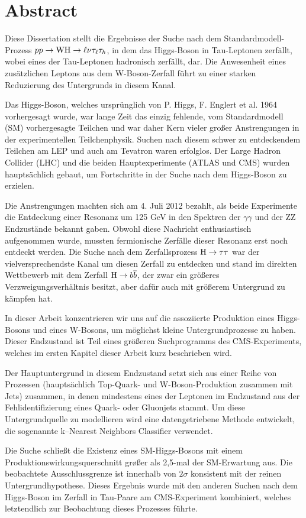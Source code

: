 \chapter*{Abstract}

Diese Dissertation stellt die Ergebnisse der Suche nach dem Standardmodell-Prozess $pp \rightarrow \mathrm{W}\mathrm{H} \rightarrow \ell \nu \tau_\ell \tau_h$, in dem das Higgs-Boson in Tau-Leptonen zerf\"allt, wobei eines der Tau-Leptonen hadronisch zerf\"allt, dar. Die Anwesenheit eines zus\"atzlichen Leptons aus dem W-Boson-Zerfall f\"uhrt zu einer starken Reduzierung des Untergrunds in diesem Kanal.

Das Higgs-Boson, welches urspr\"unglich von P. Higgs, F. Englert et al. 1964 vorhergesagt wurde, war lange Zeit das einzig fehlende, vom Standardmodell (SM) vorhergesagte Teilchen und war daher Kern vieler gro\ss{}er Anstrengungen in der experimentellen Teilchenphysik. Suchen nach diesem schwer zu entdeckendem Teilchen am LEP und auch am Tevatron waren erfolglos. Der Large Hadron Collider (LHC) und die beiden Hauptexperimente (ATLAS und CMS) wurden haupts\"achlich gebaut, um Fortschritte in der Suche nach dem Higgs-Boson zu erzielen.

Die Anstrengungen machten sich am 4. Juli 2012 bezahlt, als beide Experimente die Entdeckung einer Resonanz um 125 GeV in den Spektren der $\gamma \gamma$ und der ZZ Endzust\"ande bekannt gaben. Obwohl diese Nachricht enthusiastisch aufgenommen wurde, mussten fermionische Zerf\"alle dieser Resonanz erst noch entdeckt werden. Die Suche nach dem Zerfallsprozess $\mathrm{H} \rightarrow \tau \tau$ war der vielversprechendste Kanal um diesen Zerfall zu entdecken und stand im direkten Wettbewerb mit dem Zerfall $\mathrm{H} \rightarrow b\overline{b}$, der zwar ein gr\"o\ss{}eres Verzweigungsverh\"altnis besitzt, aber daf\"ur auch mit gr\"o\ss{}erem Untergrund zu k\"ampfen hat.

In dieser Arbeit konzentrieren wir uns auf die assoziierte Produktion eines Higgs-Bosons und eines W-Bosons, um m\"oglichst kleine Untergrundprozesse zu haben. Dieser Endzustand ist Teil eines gr\"o\ss{}eren Suchprogramms des CMS-Experiments, welches im ersten Kapitel dieser Arbeit kurz beschrieben wird.

Der Hauptuntergrund in diesem Endzustand setzt sich aus einer Reihe von Prozessen (haupts\"achlich Top-Quark- und W-Boson-Produktion zusammen mit Jets) zusammen, in denen mindestens eines der Leptonen im Endzustand aus der Fehlidentifizierung eines Quark- oder Gluonjets stammt. Um diese Untergrundquelle zu modellieren wird eine datengetriebene Methode entwickelt, die sogenannte k--Nearest Neighbors Classifier verwendet.

Die Suche schlie\ss{}t die Existenz eines SM-Higgs-Bosons mit einem Produktionswirkungsquerschnitt gr\o\ss{}er als 2,5-mal der SM-Erwartung aus. Die beobachtete Ausschlussgrenze ist innerhalb von $2\sigma$ konsistent mit der reinen Untergrundhypothese. Dieses Ergebnis wurde mit den anderen Suchen nach dem Higgs-Boson im Zerfall in Tau-Paare am CMS-Experiment kombiniert, welches letztendlich zur Beobachtung dieses Prozesses f\"uhrte.